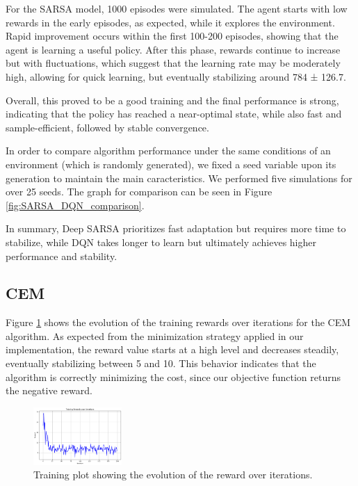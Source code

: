 \documentclass[../CSC_52081_EP.tex]{subfiles}
\begin{document}
For the SARSA model, 1000 episodes were simulated. The agent starts with low rewards in the early episodes, as expected, while it explores the environment. Rapid improvement occurs within the first 100-200 episodes, showing that the agent is learning a useful policy. After this phase, rewards continue to increase but with fluctuations, which suggest that the learning rate may be moderately high, allowing for quick learning, but eventually stabilizing around 784 ± 126.7.

Overall, this proved to be a good training and the final performance is strong, indicating that the policy has reached a near-optimal state, while also fast and sample-efficient, followed by stable convergence.

In order to compare algorithm performance under the same conditions of an environment (which is randomly generated), we fixed a seed variable upon its generation to maintain the main caracteristics.
We performed five simulations for over 25 seeds. The graph for comparison can be seen in Figure \ref{fig:SARSA_DQN_comparison}.


In summary, Deep SARSA prioritizes fast adaptation but requires more time to stabilize, while DQN takes longer to learn but ultimately achieves higher performance and stability.

\subsection{CEM}

Figure \ref{fig:train_plot} shows the evolution of the training rewards over iterations for the CEM algorithm. As expected from the minimization strategy applied in our implementation, the reward value starts at a high level and decreases steadily, eventually stabilizing between 5 and 10. This behavior indicates that the algorithm is correctly minimizing the cost, since our objective function returns the negative reward.

\begin{figure}[H]
    \centering
    \includegraphics[width=0.3\textwidth]{figures/CEM_train.png}
    \caption{Training plot showing the evolution of the reward over iterations.}
    \label{fig:train_plot}
\end{figure}
\end{document}
